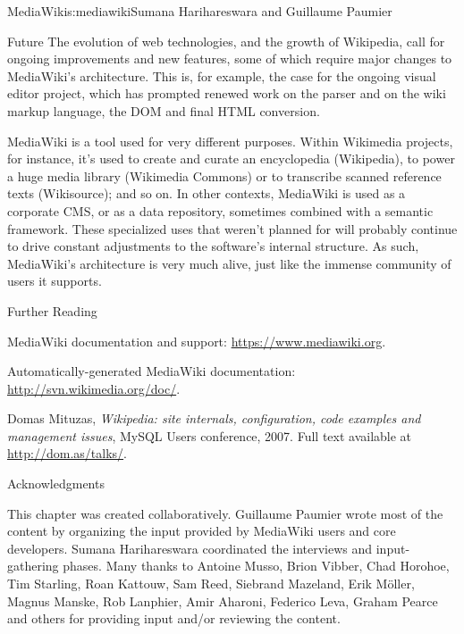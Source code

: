 \begin{aosachapter}{MediaWiki}{s:mediawiki}{Sumana Harihareswara and Guillaume Paumier}
\begin{aosasect1}{Future}
The evolution of web technologies, and the growth of Wikipedia, call
for ongoing improvements and new features, some of which require major
changes to MediaWiki's architecture. This is, for example, the case
for the ongoing visual editor project, which has prompted renewed work
on the parser and on the wiki markup language, the DOM and final HTML
conversion.

MediaWiki is a tool used for very different purposes. Within Wikimedia
projects, for instance, it's used to create and curate an encyclopedia
(Wikipedia), to power a huge media library (Wikimedia Commons) or to
transcribe scanned reference texts (Wikisource); and so on. In other
contexts, MediaWiki is used as a corporate CMS, or as a data
repository, sometimes combined with a semantic framework. These
specialized uses that weren't planned for will probably continue to
drive constant adjustments to the software's internal structure. As
such, MediaWiki's architecture is very much alive, just like the
immense community of users it supports.

\end{aosasect1}

\begin{aosasect1}{Further Reading}

\begin{aosaitemize}

\item MediaWiki documentation and support:
  \url{https://www.mediawiki.org}.

\item Automatically-generated MediaWiki documentation:
  \url{http://svn.wikimedia.org/doc/}.

\item Domas Mituzas, \emph{Wikipedia: site internals, configuration,
  code examples and management issues}, MySQL Users conference,
  2007. Full text available at \url{http://dom.as/talks/}.

\end{aosaitemize}

\end{aosasect1}

\begin{aosasect1}{Acknowledgments}

This chapter was created collaboratively. Guillaume Paumier wrote most
of the content by organizing the input provided by MediaWiki users and
core developers. Sumana Harihareswara coordinated the interviews and
input-gathering phases. Many thanks to Antoine Musso, Brion Vibber,
Chad Horohoe, Tim Starling, Roan Kattouw, Sam Reed, Siebrand Mazeland,
Erik Möller, Magnus Manske, Rob Lanphier, Amir Aharoni, Federico Leva,
Graham Pearce and others for providing input and/or reviewing the
content.

\end{aosasect1}

\end{aosachapter}
